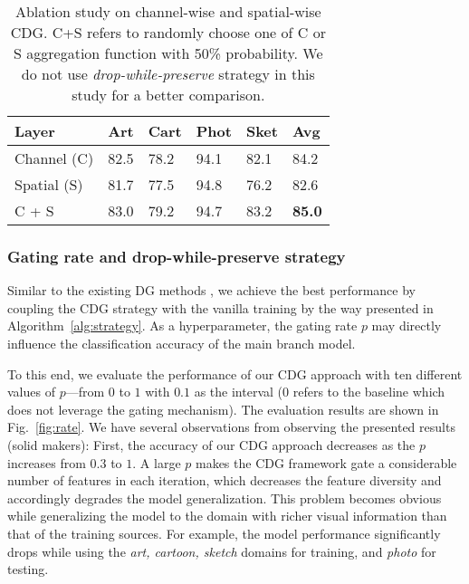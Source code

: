 \begin{table}[htb]
  \caption{Ablation study on channel-wise and spatial-wise CDG. C+S refers to randomly choose one of C or S aggregation function with 50\% probability. We do not use \textit{drop-while-preserve} strategy in this study for a better comparison.}
  \label{tab:weights}
  \begin{center}
    \begin{tabularx}{0.48\textwidth}{p{}<{\centering}|p{}<{\centering}|X<{\centering}|X<{\centering}|X<{\centering}|X<{\centering}}

      \toprule[0.6pt]
      Layer & Art & Cart & Phot & Sket & Avg           \\
      \midrule[0.4pt]

      Channel (C)  & 82.5       & 78.2    & 94.1  & 82.1   & 84.2          \\
      Spatial (S)  & 81.7       & 77.5    & 94.8  & 76.2   & 82.6          \\
      C + S        & 83.0       & 79.2    & 94.7  & 83.2   & \textbf{85.0} \\

      \bottomrule[0.6pt]
    \end{tabularx}
  \end{center}
\end{table}

\subsubsection{Gating rate and drop-while-preserve strategy}
Similar to the existing DG methods \citep{li2019episodic,huangRSC2020}, we achieve the best performance by coupling the CDG strategy with the vanilla training by the way presented in Algorithm~\ref{alg:strategy}. As a hyperparameter, the gating rate $p$ may directly influence the classification accuracy of the main branch model.


To this end, we evaluate the performance of our CDG approach with ten different values of $p$---from $0$ to $1$ with $0.1$ as the interval ($0$ refers to the baseline which does not leverage the gating mechanism). The evaluation results are shown in Fig.~\ref{fig:rate}. We have several observations from observing the presented results (solid makers): First, the accuracy of our CDG approach decreases as the $p$ increases from $0.3$ to $1$. A large $p$ makes the CDG framework gate a considerable number of features in each iteration, which decreases the feature diversity and accordingly degrades the model generalization. This problem becomes obvious while generalizing the model to the domain with richer visual information than that of the training sources. For example, the model performance significantly drops while using the \textit{art, cartoon, sketch} domains for training, and \textit{photo} for testing.

